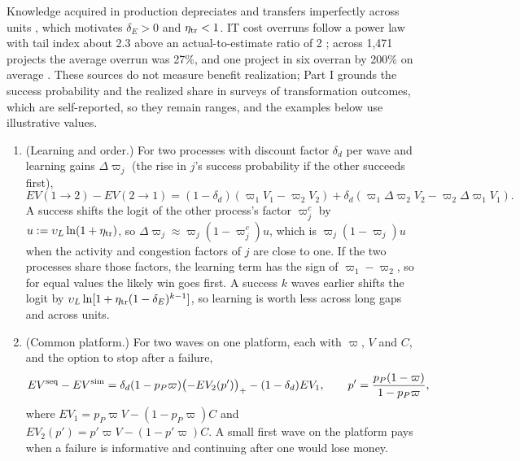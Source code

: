 Knowledge acquired in production depreciates and transfers imperfectly across units \citep{argote1990persistence,darr1995acquisition}, which motivates $\delta_E>0$ and $\eta_{\rm tr}<1$. IT cost overruns follow a power law with tail index about 2.3 above an actual-to-estimate ratio of 2 \citep{flyvbjerg2022empirical}; across 1,471 projects the average overrun was 27\%, and one project in six overran by 200\% on average \citep{flyvbjerg2011why}. These sources do not measure benefit realization; Part I grounds the success probability and the realized share in surveys of transformation outcomes, which are self-reported, so they remain ranges, and the examples below use illustrative values.

\begin{proposition}\label{prop:ext-portfolio}
\begin{enumerate}
\item[(a)] (Learning and order.) For two processes with discount factor $\delta_d$ per wave and learning gains $\Delta\varpi_j$ (the rise in $j$'s success probability if the other succeeds first),
\begin{equation}\label{eq:ext-order}
EV(1\to2)-EV(2\to1)=(1-\delta_d)(\varpi_1V_1-\varpi_2V_2)+\delta_d(\varpi_1\Delta\varpi_2V_2-\varpi_2\Delta\varpi_1V_1).
\end{equation}
A success shifts the logit of the other process's factor $\varpi^c_j$ by $u:=\upsilon_L\ln(1+\eta_{\rm tr})$, so $\Delta\varpi_j\approx\varpi_j(1-\varpi^c_j)u$, which is $\varpi_j(1-\varpi_j)u$ when the activity and congestion factors of $j$ are close to one. If the two processes share those factors, the learning term has the sign of $\varpi_1-\varpi_2$, so for equal values the likely win goes first. A success $k$ waves earlier shifts the logit by $\upsilon_L\ln[1+\eta_{\rm tr}(1-\delta_E)^{k-1}]$, so learning is worth less across long gaps and across units.
\item[(b)] (Common platform.) For two waves on one platform, each with $\varpi$, $V$ and $C$, and the option to stop after a failure,
\begin{equation}\label{eq:ext-seq}
EV^{\rm seq}-EV^{\rm sim}=\delta_d(1-p_P\varpi)\bigl(-EV_2(p')\bigr)_+-(1-\delta_d)EV_1,\qquad p'=\frac{p_P(1-\varpi)}{1-p_P\varpi},
\end{equation}
where $EV_1=p_P\varpi V-(1-p_P\varpi)C$ and $EV_2(p')=p'\varpi V-(1-p'\varpi)C$. A small first wave on the platform pays when a failure is informative and continuing after one would lose money.

\end{enumerate}
\end{proposition}
